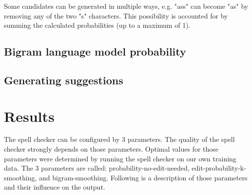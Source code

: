 \documentclass[11pt,a4paper]{article}
\begin{document}
Some candidates can be generated in multiple ways, e.g. "ass" can become "as" by removing any of the two "s" characters.
This possibility is accounted for by summing the calculated probabilities (up to a maximum of 1).

\subsection{Bigram language model probability}
\subsection{Generating suggestions}

\section{Results}
The spell checker can be configured by 3 parameters. The quality of the spell checker strongly depends on those parameters. Optimal values for those parameters were determined by running the spell checker on our own training data. The 3 parameters are called: probability-no-edit-needed, edit-probability-k-smoothing, and bigram-smoothing. Following is a description of those parameters and their influence on the output.
\end{document}
